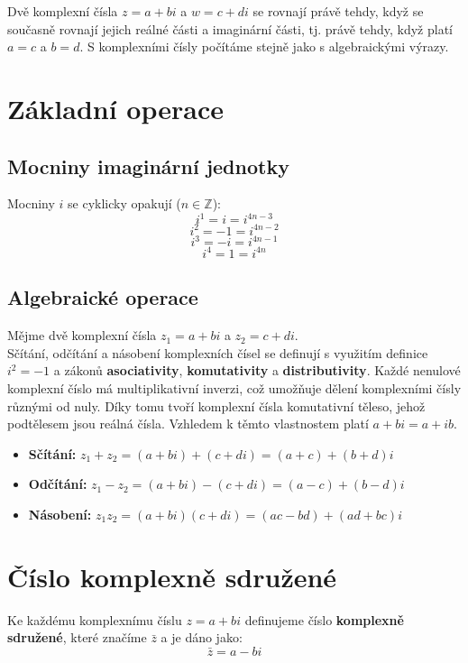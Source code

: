 \documentclass[12pt,a4paper]{report}
\begin{document}
	Dvě komplexní čísla $z = a+bi$ a $w = c+di$ se rovnají právě tehdy, když se současně rovnají jejich reálné části a imaginární části, tj. právě tehdy, když platí $a = c$ a $b = d$. S komplexními čísly počítáme stejně jako s algebraickými výrazy.
	
	
	\section{Základní operace}
	
	\subsection{Mocniny imaginární jednotky}
	\label{sec:1.2}
	
	Mocniny $i$ se cyklicky opakují ($n\in\mathbb{Z}$):
	$$i^1=i=i^{4n-3}$$
	$$i^2=-1=i^{4n-2}$$
	$$i^3=-i=i^{4n-1}$$
	$$i^4=1=i^{4n}$$
	
	
	\subsection{Algebraické operace}
	Mějme dvě komplexní čísla $z_1 = a + bi$ a $z_2 = c + di$.\\
	Sčítání, odčítání a násobení komplexních čísel se definují s využitím definice $i^2=-1$ a zákonů \textbf{asociativity}, \textbf{komutativity} a \textbf{distributivity}. Každé nenulové komplexní číslo má multiplikativní inverzi, což umožňuje dělení komplexními čísly různými od nuly. Díky tomu tvoří komplexní čísla komutativní těleso, jehož podtělesem jsou reálná čísla. Vzhledem k těmto vlastnostem platí $a+bi = a+ib$.
	
	\begin{itemize}
		\item \textbf{Sčítání:} $z_1 + z_2 = (a+bi) + (c+di) = (a+c) + (b+d)i$
		\item \textbf{Odčítání:} $z_1 - z_2 = (a+bi) - (c+di) = (a-c) + (b-d)i$
		\item \textbf{Násobení:} $z_1 z_2 = (a+bi)(c+di)=(ac - bd) + (ad + bc)i$
	\end{itemize}
	
	
	\section{Číslo komplexně sdružené}
	Ke každému komplexnímu číslu $z = a + bi$ definujeme číslo \textbf{komplexně sdružené}, které značíme $\bar{z}$ a je dáno jako:
	\begin{equation}
		\bar{z} = a - bi
	\end{equation}
	
\end{document}

